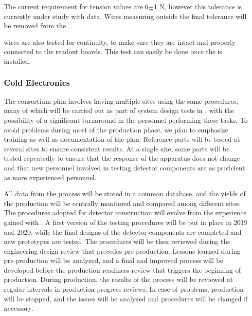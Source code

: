 The current requirement for tension values are 6$\pm$1 N, however this tolerance is currently under study with  data. %
Wires measuring outside the final tolerance %
will be removed from the .

 wires are also tested for %
continuity, to make sure they are %
intact and properly connected to the readout boards. This test can easily be done once the  is installed. %

\subsubsection{Cold Electronics}
The  consortium plan involves
having multiple sites using the same  procedures,
many of which will be carried out as part of system design tests in ,
with the possibility of a significant turnaround in the personnel
performing these tasks. To avoid problems during most of the
production phase, we plan to emphasize training as well as documentation
of the  plan. Reference parts will be tested at
several sites to ensure consistent results. At
a single site, some parts will be tested repeatedly to ensure
that the response of the apparatus does not change and
that new personnel involved in testing detector components are 
as proficient as more experienced personnel. 

All data from
the  process will be stored in a common database, and
the yields of the production will be centrally monitored and 
compared among different sites. The procedures adopted
for detector construction will evolve from the experience
gained with . A first version of the testing procedures
will be put in place in 2019 and 2020, while the final designs of
the detector components are completed and new prototypes are
tested. The  procedures will be then reviewed
during the engineering design review that precedes pre-production. Lessons learned during pre-production
will be analyzed, and a final and improved  process will be 
developed before the production readiness review that triggers
the beginning of production. During production, the results
of the  process will be reviewed at regular intervals
in production progress reviews. In case of problems, production
will be stopped, and the issues will be analyzed 
and procedures will be changed if necessary.

